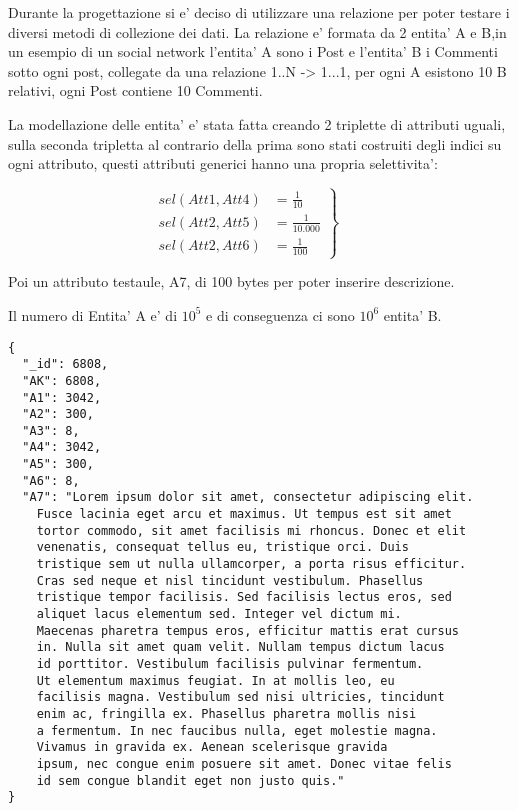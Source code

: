 Durante la progettazione si e' deciso di utilizzare una relazione per poter testare i diversi metodi di collezione dei dati.
La relazione e' formata da 2 entita' A e B,in un esempio di un social network l'entita' A sono i Post e l'entita' B i Commenti sotto ogni post, collegate da una relazione 1..N -> 1...1,
per ogni A esistono 10 B relativi, ogni Post contiene 10 Commenti.

La modellazione delle entita' e' stata fatta creando 2 triplette di attributi uguali, sulla seconda tripletta al contrario della prima sono stati costruiti degli indici su ogni attributo,
questi attributi generici hanno una propria selettivita':

    \begin{equation*}
        \left.\begin{aligned}
         sel(Att1, Att4) &= \frac{1}{10}    \\
         sel(Att2, Att5) &= \frac{1}{10.000} \\
         sel(Att2, Att6) &= \frac{1}{100}
        \end{aligned}
        \right\}
        \qquad 
        \end{equation*}

Poi un attributo testaule, A7, di 100 bytes per poter inserire descrizione.

Il numero di Entita' A e' di $10^5$ e di conseguenza ci sono $10^6$ entita' B.

\begin{Verbatim}[frame=single,framesep=2mm,label=A (POST),labelposition=all]
{
  "_id": 6808,
  "AK": 6808,
  "A1": 3042,
  "A2": 300,
  "A3": 8,
  "A4": 3042,
  "A5": 300,
  "A6": 8,
  "A7": "Lorem ipsum dolor sit amet, consectetur adipiscing elit. 
    Fusce lacinia eget arcu et maximus. Ut tempus est sit amet 
    tortor commodo, sit amet facilisis mi rhoncus. Donec et elit
    venenatis, consequat tellus eu, tristique orci. Duis 
    tristique sem ut nulla ullamcorper, a porta risus efficitur.
    Cras sed neque et nisl tincidunt vestibulum. Phasellus 
    tristique tempor facilisis. Sed facilisis lectus eros, sed 
    aliquet lacus elementum sed. Integer vel dictum mi. 
    Maecenas pharetra tempus eros, efficitur mattis erat cursus
    in. Nulla sit amet quam velit. Nullam tempus dictum lacus
    id porttitor. Vestibulum facilisis pulvinar fermentum.
    Ut elementum maximus feugiat. In at mollis leo, eu 
    facilisis magna. Vestibulum sed nisi ultricies, tincidunt
    enim ac, fringilla ex. Phasellus pharetra mollis nisi
    a fermentum. In nec faucibus nulla, eget molestie magna.
    Vivamus in gravida ex. Aenean scelerisque gravida 
    ipsum, nec congue enim posuere sit amet. Donec vitae felis
    id sem congue blandit eget non justo quis."
}
\end{Verbatim}


